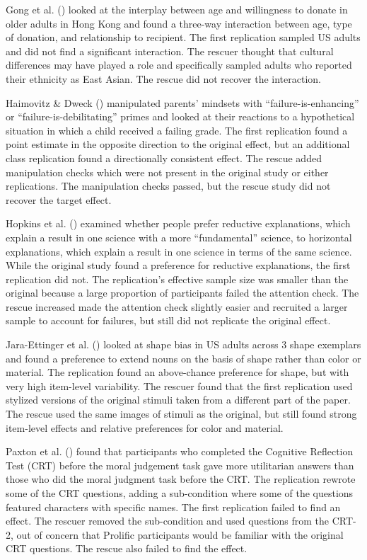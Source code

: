 \documentclass[
  english,
  a4paper,
]{article}
\begin{document}
Gong et al. () looked at the interplay between age and willingness to donate in older adults in Hong Kong and found a three-way interaction between age, type of donation, and relationship to recipient.
The first replication sampled US adults and did not find a significant interaction.
The rescuer thought that cultural differences may have played a role and specifically sampled adults who reported their ethnicity as East Asian.
The rescue did not recover the interaction.

Haimovitz \& Dweck () manipulated parents' mindsets with ``failure-is-enhancing'' or ``failure-is-debilitating'' primes and looked at their reactions to a hypothetical situation in which a child received a failing grade.
The first replication found a point estimate in the opposite direction to the original effect, but an additional class replication found a directionally consistent effect.
The rescue added manipulation checks which were not present in the original study or either replications.
The manipulation checks passed, but the rescue study did not recover the target effect.

Hopkins et al. () examined whether people prefer reductive explanations, which explain a result in one science with a more ``fundamental'' science, to horizontal explanations, which explain a result in one science in terms of the same science.
While the original study found a preference for reductive explanations, the first replication did not.
The replication's effective sample size was smaller than the original because a large proportion of participants failed the attention check.
The rescue increased made the attention check slightly easier and recruited a larger sample to account for failures, but still did not replicate the original effect.

Jara-Ettinger et al. () looked at shape bias in US adults across 3 shape exemplars and found a preference to extend nouns on the basis of shape rather than color or material.
The replication found an above-chance preference for shape, but with very high item-level variability.
The rescuer found that the first replication used stylized versions of the original stimuli taken from a different part of the paper.
The rescue used the same images of stimuli as the original, but still found strong item-level effects and relative preferences for color and material.

Paxton et al. () found that participants who completed the Cognitive Reflection Test (CRT) before the moral judgement task gave more utilitarian answers than those who did the moral judgment task before the CRT.
The replication rewrote some of the CRT questions, adding a sub-condition where some of the questions featured characters with specific names.
The first replication failed to find an effect.
The rescuer removed the sub-condition and used questions from the CRT-2, out of concern that Prolific participants would be familiar with the original CRT questions.
The rescue also failed to find the effect.
\end{document}
